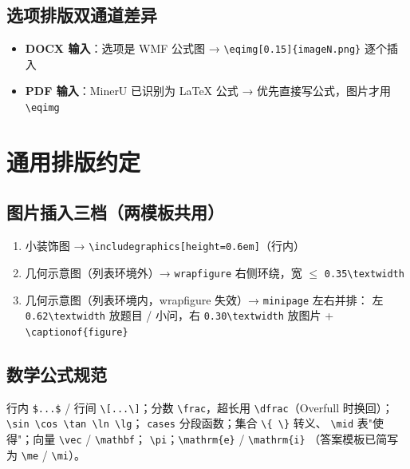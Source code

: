 \documentclass[11pt,a4paper]{ctexart}
\begin{document}
\subsection{选项排版双通道差异}

\begin{itemize}
  \item \textbf{DOCX 输入}：选项是 WMF 公式图 → \texttt{\textbackslash eqimg[0.15]\{imageN.png\}}
        逐个插入
  \item \textbf{PDF 输入}：MinerU 已识别为 LaTeX 公式 → 优先直接写公式，图片才用
        \texttt{\textbackslash eqimg}
\end{itemize}

\section{通用排版约定}

\subsection{图片插入三档（两模板共用）}

\begin{enumerate}
  \item 小装饰图 → \texttt{\textbackslash includegraphics[height=0.6em]}（行内）
  \item 几何示意图（列表环境外）→ \texttt{wrapfigure} 右侧环绕，宽 $\leq$ \texttt{0.35\textbackslash textwidth}
  \item 几何示意图（列表环境内，wrapfigure 失效）→ \texttt{minipage} 左右并排：
        左 \texttt{0.62\textbackslash textwidth} 放题目 / 小问，右 \texttt{0.30\textbackslash textwidth}
        放图片 + \texttt{\textbackslash captionof\{figure\}}
\end{enumerate}

\subsection{数学公式规范}

行内 \texttt{\$...\$} / 行间 \texttt{\textbackslash[...\textbackslash]}；分数
\texttt{\textbackslash frac}，超长用 \texttt{\textbackslash dfrac}（Overfull 时换回）；
\texttt{\textbackslash sin \textbackslash cos \textbackslash tan \textbackslash ln \textbackslash lg}；
\texttt{cases} 分段函数；集合 \texttt{\textbackslash\{ \textbackslash\}} 转义、
\texttt{\textbackslash mid} 表"使得"；向量 \texttt{\textbackslash vec} / \texttt{\textbackslash mathbf}；
\texttt{\textbackslash pi}；\texttt{\textbackslash mathrm\{e\}} / \texttt{\textbackslash mathrm\{i\}}
（答案模板已简写为 \texttt{\textbackslash me} / \texttt{\textbackslash mi}）。
\end{document}
